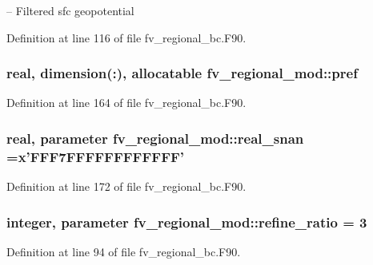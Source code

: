 -- Filtered sfc geopotential 



Definition at line 116 of file fv\-\_\-regional\-\_\-bc.\-F90.

\subsubsection[{pref}]{\setlength{\rightskip}{0pt plus 5cm}real, dimension(\-:), allocatable fv\-\_\-regional\-\_\-mod\-::pref\hspace{0.3cm}{\ttfamily [private]}}\label{classfv__regional__mod_ac942190aa433f5ffa8901ccf140b1663}


Definition at line 164 of file fv\-\_\-regional\-\_\-bc.\-F90.

\subsubsection[{real\-\_\-snan}]{\setlength{\rightskip}{0pt plus 5cm}real, parameter fv\-\_\-regional\-\_\-mod\-::real\-\_\-snan =x'F\-F\-F7\-F\-F\-F\-F\-F\-F\-F\-F\-F\-F\-F\-F'\hspace{0.3cm}{\ttfamily [private]}}\label{classfv__regional__mod_a0caa164db78f0352f7124e34227e9950}


Definition at line 172 of file fv\-\_\-regional\-\_\-bc.\-F90.

\subsubsection[{refine\-\_\-ratio}]{\setlength{\rightskip}{0pt plus 5cm}integer, parameter fv\-\_\-regional\-\_\-mod\-::refine\-\_\-ratio = 3\hspace{0.3cm}{\ttfamily [private]}}\label{classfv__regional__mod_a9d0455a3e9bf0fc4147b96aae64bf741}


Definition at line 94 of file fv\-\_\-regional\-\_\-bc.\-F90.

